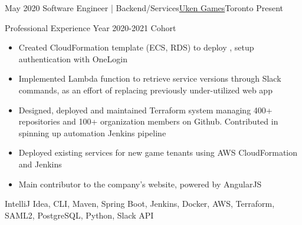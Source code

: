 %
%
%
\begin{experiences}
  \experience
    {May 2020}   {Software Engineer | Backend/Services}{\href{https://uken.com}{Uken Games}}{Toronto}
    {Present} {
                    Professional Experience Year 2020-2021 Cohort 
                    \begin{itemize}
                        \item Created CloudFormation template (ECS, RDS) to deploy , setup authentication with OneLogin
                        
                        \item Implemented Lambda function to retrieve service versions through Slack commands, as an effort of replacing previously under-utilized web app
                        
                        \item Designed, deployed and maintained Terraform system managing 400+ repositories and 100+ organization members on Github. Contributed in spinning up automation Jenkins pipeline
                        
                        \item Deployed existing services for new game tenants using AWS CloudFormation and Jenkins
                        
                        \item Main contributor to the company's website, powered by AngularJS
                    \end{itemize}
                    }
                    {IntelliJ Idea, CLI, Maven, Spring Boot, Jenkins, Docker, AWS, Terraform, SAML2, PostgreSQL, Python, Slack API}
\end{experiences}
